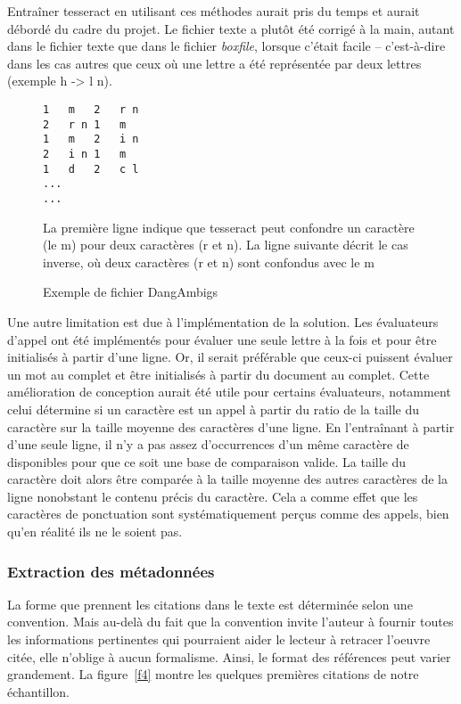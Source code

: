 Entraîner tesseract en utilisant ces méthodes aurait pris du temps et aurait débordé du cadre du projet. Le fichier texte a plutôt été corrigé à la main, autant dans le fichier texte que dans le fichier \emph{boxfile}, lorsque c'était facile -- c'est-à-dire dans les cas autres que ceux où une lettre a été représentée par deux lettres (exemple h -> l n).

\begin{figure*}
\begin{lstlisting}
1	m	2	r n
2	r n	1	m
1	m	2	i n
2	i n	1	m
1	d	2	c l
...
...
\end{lstlisting}


\caption{Exemple de fichier DangAmbigs}{La première ligne indique que tesseract peut confondre un caractère (le m) pour deux caractères (r et n). La ligne suivante décrit le cas inverse, où deux caractères (r et n) sont confondus avec le m}
\label{figure-dangambigs}
\end{figure*}
Une autre limitation est due à l'implémentation de la solution. Les évaluateurs d'appel ont été implémentés pour évaluer une seule lettre à la fois et pour être initialisés à partir d'une ligne. Or, il serait préférable que ceux-ci puissent évaluer un mot au complet et être initialisés à partir du document au complet. Cette amélioration de conception aurait été utile pour certains évaluateurs, notamment celui détermine si un caractère est un appel à partir du ratio de la taille du caractère sur la taille moyenne des caractères d'une ligne. En l'entraînant à partir d'une seule ligne, il n'y a pas assez d'occurrences d'un même caractère de disponibles pour que ce soit une base de comparaison valide. La taille du caractère doit alors être comparée à la taille moyenne des autres caractères de la ligne nonobstant le contenu précis du caractère. Cela a comme effet que les caractères de ponctuation sont systématiquement perçus comme des appels, bien qu'en réalité ils ne le soient pas.



\subsubsection{Extraction des métadonnées}
La forme que prennent les citations dans le texte est déterminée selon une convention. Mais au-delà du fait que la convention invite l'auteur à fournir toutes les informations pertinentes qui pourraient aider le lecteur à retracer l'oeuvre citée, elle n'oblige à aucun formalisme. Ainsi, le format des références peut varier grandement. La figure~\ref{f4} montre les quelques premières citations de notre échantillon.

